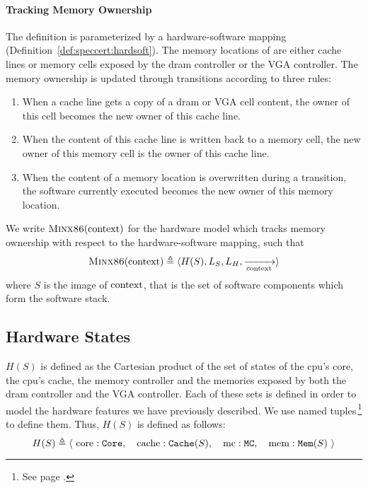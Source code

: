 \paragraph{Tracking Memory Ownership}
%
The  definition is parameterized by a hardware-software
mapping  (Definition~\ref{def:speccert:hardsoft}).
%
The memory locations of  are either cache lines or memory
cells exposed by the \ac{dram} controller or the VGA controller.
%
The memory ownership is updated through transitions according to three rules:
%
\begin{enumerate}
\item When a cache line gets a copy of a \ac{dram} or VGA cell content, the
  owner of this cell becomes the new owner of this cache line.
%
\item When the content of this cache line is written back to a memory cell, the
  new owner of this memory cell is the owner of this cache line.
%
\item When the content of a memory location is overwritten during a transition,
  the software currently executed becomes the new owner of this memory location.
%
\end{enumerate}

\begin{definition}
  We write $\textsc{Minx86}(\mathrm{context})$ for the hardware model which
  tracks memory ownership with respect to the  hardware-software
  mapping, such that
%
  \[
    \textsc{Minx86}(\mathrm{context}) \triangleq \langle H(S), L_S, L_H,
    \xrightarrow[\mathrm{context}]{} \rangle
  \]
  where $S$ is the image of $\mathrm{context}$, that is the set of software
  components which form the software stack.
\end{definition}

\subsection{Hardware States}

$H(S)$ is defined as the Cartesian product of the set of states of the
\ac{cpu}'s core, the \ac{cpu}'s cache, the memory controller and the memories
exposed by both the \ac{dram} controller and the VGA controller.
%
Each of these sets is defined in order to model the hardware features we have
previously described.
%
We use named tuples\,\footnote{See page \pageref{frontmatter:notations}.} to
define them.
%
Thus, $H(S)$ is defined as follows:
%
\[
  H(S) \triangleq \left<\ \mathrm{core}: \texttt{Core},\quad\mathrm{cache}:
  \texttt{Cache}(S),\quad\mathrm{mc}: \texttt{MC},\quad\mathrm{mem}: \texttt{Mem}(S)
  \ \right>
\]

